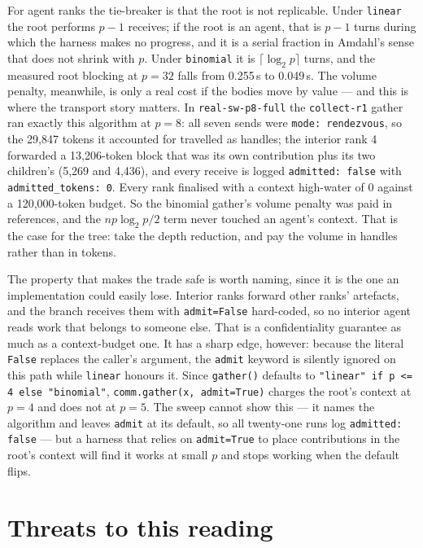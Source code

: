 \documentclass[11pt]{article}
\begin{document}
For agent ranks the tie-breaker is that the root is not replicable. Under \texttt{linear} the
root performs $p-1$ receives; if the root is an agent, that is $p-1$ turns during which the
harness makes no progress, and it is a serial fraction in Amdahl's sense that does not shrink
with $p$. Under \texttt{binomial} it is $\lceil\log_2 p\rceil$ turns, and the measured root
blocking at $p=32$ falls from 0.255\,s to 0.049\,s. The volume penalty, meanwhile, is only a real
cost if the bodies move by value --- and this is where the transport story matters. In
\texttt{real-sw-p8-full} the \texttt{collect-r1} gather ran exactly this algorithm at $p=8$: all
seven sends were \texttt{mode: rendezvous}, so the 29,847 tokens it accounted for travelled as
handles; the interior rank 4 forwarded a 13,206-token block that was its own contribution plus
its two children's (5,269 and 4,436), and every receive is logged \texttt{admitted: false} with
\texttt{admitted\_tokens: 0}. Every rank finalised with a context high-water of 0 against a
120,000-token budget. So the binomial gather's volume penalty was paid in references, and the
$np\log_2 p/2$ term never touched an agent's context. That is the case for the tree: take the
depth reduction, and pay the volume in handles rather than in tokens.

The property that makes the trade safe is worth naming, since it is the one an implementation
could easily lose. Interior ranks forward other ranks' artefacts, and the branch receives them
with \texttt{admit=False} hard-coded, so no interior agent reads work that belongs to someone
else. That is a confidentiality guarantee as much as a context-budget one. It has a sharp edge,
however: because the literal \texttt{False} replaces the caller's argument, the \texttt{admit}
keyword is silently ignored on this path while \texttt{linear} honours it. Since
\texttt{gather()} defaults to \texttt{"linear" if p <= 4 else "binomial"},
\texttt{comm.gather(x, admit=True)} charges the root's context at $p=4$ and does not at $p=5$.
The sweep cannot show this --- it names the algorithm and leaves \texttt{admit} at its default,
so all twenty-one runs log \texttt{admitted: false} --- but a harness that relies on
\texttt{admit=True} to place contributions in the root's context will find it works at small $p$
and stops working when the default flips.

\section{Threats to this reading}
\end{document}

